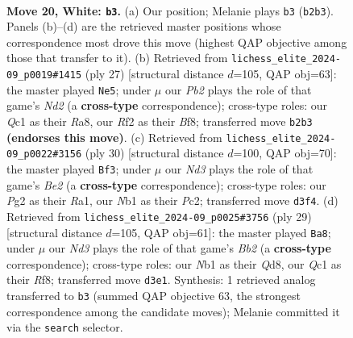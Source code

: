\documentclass[11pt]{article}
\begin{document}
\begin{figure}[p]
\label{fig:thought-m36}
\end{figure}

\clearpage

\begin{figure}[p]\centering
\begin{subfigure}{0.46\textwidth}\centering
\resizebox{\linewidth}{!}{%
\newchessgame
\chessboard[
  setfen={5rk1/3brppp/4p3/p1pq3n/n7/3NP1P1/PP2BRPP/RNQ3K1 w - - 4 20},
  showmover=false,
  pgfstyle=straightmove, color=movearrow, markmove={b2-b3}
]}
\caption{}
\end{subfigure}\hfill
\begin{subfigure}{0.46\textwidth}\centering
\resizebox{\linewidth}{!}{%
\newchessgame
\chessboard[
  setfen={r3kb1r/3n1ppp/p3p3/3q4/Np1Nn3/4BQP1/PP3P1P/R4RK1 b kq - 3 14},
  showmover=false,
  pgfstyle=straightmove, color=movearrow, markmove={d7-e5}
]}
\caption{}
\end{subfigure}
\\[4pt]
\begin{subfigure}{0.46\textwidth}\centering
\resizebox{\linewidth}{!}{%
\newchessgame
\chessboard[
  setfen={rnb2rk1/4nppp/p3p3/4q3/Np1N4/8/PPPQB1PP/R4RK1 w - - 0 16},
  showmover=false,
  pgfstyle=straightmove, color=movearrow, markmove={e2-f3}
]}
\caption{}
\end{subfigure}\hfill
\begin{subfigure}{0.46\textwidth}\centering
\resizebox{\linewidth}{!}{%
\newchessgame
\chessboard[
  setfen={3q1rk1/1b3ppp/r2b1n2/2ppN3/4PP2/1QNPB3/PP4PP/R4RK1 b - - 0 15},
  showmover=false,
  pgfstyle=straightmove, color=movearrow, markmove={b7-a8}
]}
\caption{}
\end{subfigure}
\caption{\textbf{Move 20, White: \texttt{b3}.} (a) Our position; Melanie plays \texttt{b3} (\texttt{b2b3}). Panels (b)--(d) are the retrieved master positions whose correspondence most drove this move (highest QAP objective among those that transfer to it). (b) Retrieved from \texttt{lichess\_elite\_2024-09\_p0019\#1415} (ply 27) [structural distance $d$=105, QAP obj=63]: the master played \texttt{Ne5}; under $\mu$ our \emph{Pb2} plays the role of that game's \emph{Nd2} (a \textbf{cross-type} correspondence); cross-type roles: our \emph{Q}c1 as their \emph{R}a8, our \emph{R}f2 as their \emph{B}f8; transferred move \texttt{b2b3} \textbf{(endorses this move)}. (c) Retrieved from \texttt{lichess\_elite\_2024-09\_p0022\#3156} (ply 30) [structural distance $d$=100, QAP obj=70]: the master played \texttt{Bf3}; under $\mu$ our \emph{Nd3} plays the role of that game's \emph{Be2} (a \textbf{cross-type} correspondence); cross-type roles: our \emph{P}g2 as their \emph{R}a1, our \emph{N}b1 as their \emph{P}c2; transferred move \texttt{d3f4}. (d) Retrieved from \texttt{lichess\_elite\_2024-09\_p0025\#3756} (ply 29) [structural distance $d$=105, QAP obj=61]: the master played \texttt{Ba8}; under $\mu$ our \emph{Nd3} plays the role of that game's \emph{Bb2} (a \textbf{cross-type} correspondence); cross-type roles: our \emph{N}b1 as their \emph{Q}d8, our \emph{Q}c1 as their \emph{R}f8; transferred move \texttt{d3e1}. Synthesis: 1 retrieved analog transferred to \texttt{b3} (summed QAP objective 63, the strongest correspondence among the candidate moves); Melanie committed it via the \texttt{search} selector.}

\end{figure}
\end{document}

